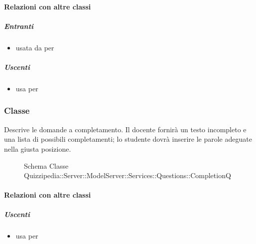 \paragraph{Relazioni con altre classi}
\subparagraph{Entranti}
\begin{itemize}
\item usata da  per 
\end{itemize}
\subparagraph{Uscenti}
\begin{itemize}
\item usa  per 
\end{itemize}
\subsubsection{Classe }
Descrive le domande a completamento. Il docente fornirà un testo incompleto e una lista di possibili completamenti; lo studente dovrà inserire le parole adeguate nella giusta posizione.
\begin{figure}[H]
\centering
\noindent{}
\caption[Schema Classe CompletionQ]{Schema Classe Quizzipedia::Server::ModelServer::Services::Questions::CompletionQ}
\end{figure}
\paragraph{Relazioni con altre classi}
\subparagraph{Uscenti}
\begin{itemize}
\item usa  per 
\end{itemize}
